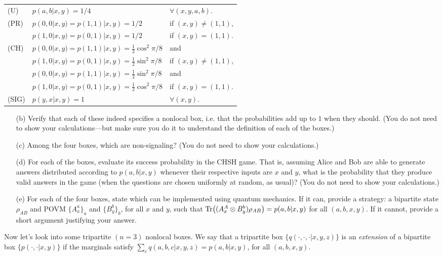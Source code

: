 \documentclass[12pt]{article}
\begin{document}
\begin{enumerate}
\begin{center}
\begin{tabular}{lll}
(U) & $p(a,b|x,y) = 1/4$& $\forall (x,y,a,b)$.\\[2mm]
(PR)& $p(0,0|x,y)=p(1,1)|x,y)=1/2$ & {if }$(x,y)\neq (1,1)$,\\
& $p(1,0|x,y)=p(0,1)|x,y)=1/2$ & {if }$(x,y)= (1,1)$.\\[2mm]
(CH) {}& $p(0,0|x,y)=p(1,1)|x,y)= \frac{1}{2}\cos^2\pi/8$ & and\\
& $p(1,0|x,y)=p(0,1)|x,y)= \frac{1}{2}\sin^2\pi/8$ & if $(x,y)\neq (1,1)$,\\
& $p(0,0|x,y)=p(1,1)|x,y)= \frac{1}{2}\sin^2\pi/8$ & and\\
& $p(1,0|x,y)=p(0,1)|x,y)= \frac{1}{2}\cos^2 \pi/8$ & if $(x,y)= (1,1)$.\\[2mm]
(SIG) & $p(y,x|x,y) = 1$ & $\forall (x,y)$.\\
\end{tabular}
\end{center}
\begin{enumerate}
\item[(b)] Verify that each of these indeed specifies a nonlocal box, i.e. that the probabilities add up to $1$ when they should. (You do not need to show your calculations---but make sure you do it to understand the definition of each of the boxes.)
\item[(c)] Among the four boxes, which are non-signaling? (You do not need to show your calculations.)
\item[(d)] For each of the boxes, evaluate its success probability in the CHSH game. That is, assuming Alice and Bob are able to generate answers distributed according to $p(a,b|x,y)$ whenever their respective inputs are $x$ and $y$, what is the probability that they produce valid answers in the game (when the questions are chosen uniformly at random, as usual)? (You do not need to show your calculations.)
\item[(e)] For each of the four boxes, state which can be implemented using quantum mechanics. If it can, provide a strategy: a bipartite state $\rho_{AB}$ and POVM $\{A_x^a\}_a$ and $\{B_y^b\}_b$, for all $x$ and $y$, such that $\mathrm{Tr}\big( (A_x^A \otimes B_y^b) \rho_{AB}\big)=p(a,b|x,y)$ for all $(a,b,x,y)$. If it cannot, provide a short argument justifying your answer. 
\end{enumerate}
Now let's look into some tripartite $(n=3)$ nonlocal boxes. We say that a tripartite box $\{q(\cdot,\cdot,\cdot|x,y,z)\}$ is an \emph{extension} of a bipartite box $\{p(\cdot,\cdot|x,y)\}$ if the marginals satisfy $\sum_c q(a,b,c|x,y,z) = p(a,b|x,y)$, for all $(a,b,x,y)$. 

\end{enumerate}
\end{document}
